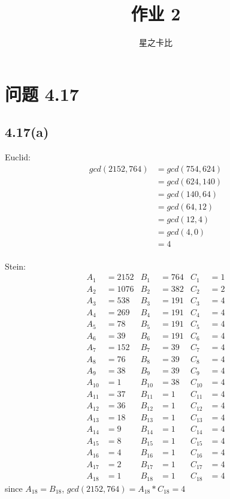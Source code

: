 \documentclass[acmlarge,screen]{acmart}
\begin{document}
\title{作业 2}
\author{星之卡比}
\maketitle
\section{问题 4.17}
\subsection{4.17(a)}
\begin{multicols}{2}
Euclid:
\begin{align*}
	gcd(2152, 764) &= gcd(754, 624)\\
	&= gcd(624, 140)\\
	&= gcd(140, 64)\\
	&= gcd(64, 12)\\
	&= gcd(12, 4)\\
	&= gcd(4, 0)\\
	&= 4
\end{align*}
\columnbreak \\
Stein:
\begin{align*}
	A_1&=2152 & B_1&=764 & C_1&=1\\
	A_2&=1076 & B_2&=382 & C_2&=2\\
	A_3&=538 & B_3&=191 & C_3&=4\\
	A_4&=269 & B_4&=191 & C_4&=4\\
	A_5&=78 & B_5&=191 & C_5&=4\\
	A_6&=39 & B_6&=191 & C_6&=4\\
	A_7&=152 & B_7&=39 & C_7&=4\\
	A_8&=76 & B_8&=39 & C_8&=4\\
	A_9&=38 & B_9&=39 & C_9&=4\\
	A_{10}&=1 & B_{10}&=38 & C_{10}&=4\\
	A_{11}&=37 & B_{11}&=1 & C_{11}&=4\\
	A_{12}&=36 & B_{12}&=1 & C_{12}&=4\\
	A_{13}&=18 & B_{13}&=1 & C_{13}&=4\\
	A_{14}&=9 & B_{14}&=1 & C_{14}&=4\\
	A_{15}&=8 & B_{15}&=1 & C_{15}&=4\\
	A_{16}&=4 & B_{16}&=1 & C_{16}&=4\\
	A_{17}&=2 & B_{17}&=1 & C_{17}&=4\\
	A_{18}&=1 & B_{18}&=1 & C_{18}&=4
\end{align*}
since $A_{18}=B_{18}$, $gcd(2152, 764)=A_{18}*C_{18}=4$
\end{multicols}
\end{document}
